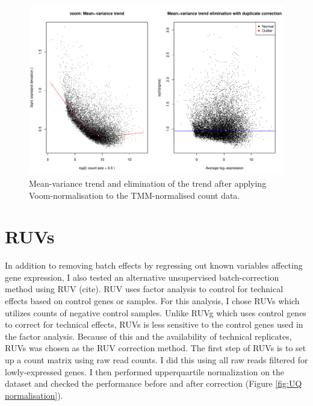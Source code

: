 \documentclass[12pt,a4paper,titlepage,twoside,openright]{book}
\begin{document}
\begin{mainmatter}
\begin{figure}[htb!]
\centering
\includegraphics[width=\textwidth,height=\textheight,keepaspectratio]{Limma_voomDuplicateCorrelation_TMMNormalisation.pdf}
\caption{Mean-variance trend and elimination of the trend after applying Voom-normalisation to the TMM-normalised count data.}
\label{fig:Voom normalisation}
\end{figure}

\section{RUVs}
In addition to removing batch effects by regressing out known variables affecting gene expression, I also tested an alternative unsupervised batch-correction method using RUV (cite). RUV uses factor analysis to control for technical effects based on control genes or samples. For this analysis, I chose RUVs which utilizes counts of negative control samples. Unlike RUVg which uses control genes to correct for technical effects, RUVs is less sensitive to the control genes used in the factor analysis. Because of this and the availability of technical replicates, RUVs was chosen as the RUV correction method. 
The first step of RUVs is to set up a count matrix using raw read counts. I did this using all raw reads filtered for lowly-expressed genes. I then performed upperquartile normalization on the dataset and checked the performance before and after correction (﻿Figure \ref{fig:UQ normalisation}﻿). 


\end{mainmatter}
\end{document}
